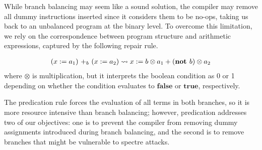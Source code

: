While branch balancing may seem like a sound solution, the compiler may remove all dummy instructions inserted since it considers them to be no-ops, taking us back to an unbalanced program at the binary level. To overcome this limitation, we rely on the correspondence between program structure and arithmetic expressions, captured by the following repair rule.
\begin{definition}[Predication]
\begin{align*}
\branch{b}{(x:=a_1)}{(x:=a_2)} \leadsto x:=b\otimes a_1+(\textbf{not }b)\otimes a_2
\end{align*}
where $\otimes$ is multiplication, but it interprets the boolean condition as 0 or 1 depending on whether the condition evaluates to $\textbf{false}$ or $\textbf{true}$, respectively. 
\end{definition}
The predication rule forces the evaluation of all terms in both branches, so it is more resource intensive than branch balancing; however, predication addresses two of our objectives: one is to prevent the compiler from removing dummy assignments introduced during branch balancing, and the second is to remove branches that might be vulnerable to spectre attacks.

